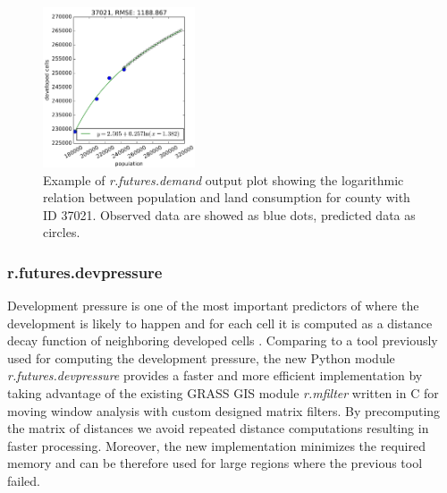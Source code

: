 \documentclass{isprs}
\begin{document}
\begin{figure}[h!]
 \centering
 \includegraphics[width=0.4\textwidth]{./figures/plot_demand.pdf}
 \caption{Example of \emph{r.futures.demand} output plot showing
 the logarithmic relation between population and land consumption
 for county with ID 37021.
 Observed data are showed as blue dots, predicted data as circles.
 }
 \label{fig:demand}
\end{figure}

\subsubsection{r.futures.devpressure}
Development pressure is one of the most
important predictors of where
the development is likely to happen
and for each cell it is computed as a distance decay function of neighboring
developed cells \cite{Meentemeyer2012}.
Comparing to a tool previously used for computing the development pressure,
the new Python module \emph{r.futures.devpressure} provides a faster and more efficient 
implementation by taking advantage of the existing GRASS GIS 
module \emph{r.mfilter} written in C for moving window analysis with custom designed matrix filters.
By precomputing the matrix of distances we avoid repeated distance computations
resulting in faster processing. Moreover, the new implementation
minimizes the required memory and can be therefore used for
large regions where the previous tool failed.
\end{document}
